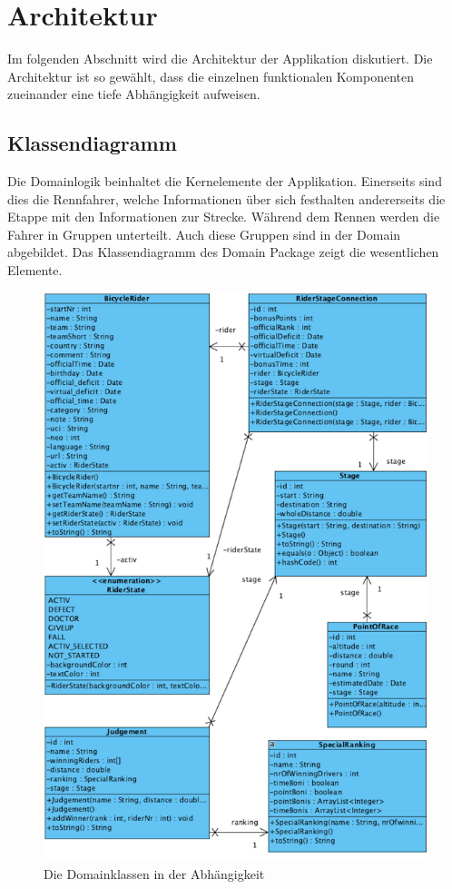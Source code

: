 \chapter{Architektur}
Im folgenden Abschnitt wird die Architektur der Applikation diskutiert. Die Architektur ist so gewählt, dass die einzelnen funktionalen Komponenten zueinander eine tiefe Abhängigkeit aufweisen.

\section{Klassendiagramm}
Die Domainlogik beinhaltet die Kernelemente der Applikation. Einerseits sind dies die Rennfahrer, welche Informationen über sich festhalten andererseits die Etappe mit den Informationen zur Strecke. Während dem Rennen werden die Fahrer in Gruppen unterteilt. Auch diese Gruppen sind in der Domain abgebildet. Das Klassendiagramm des Domain Package zeigt die wesentlichen Elemente.

\begin{figure}[h!]
\caption{Die Domainklassen in der Abhängigkeit}
\label{fig:domain}
\centering
\includegraphics{05technischerbericht/images/domain.png}
\end{figure} 


